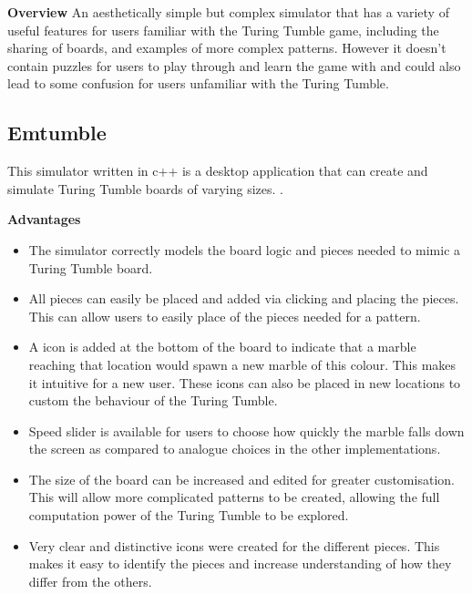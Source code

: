 \documentclass{l4proj}
\begin{document}
\textbf{Overview}
An aesthetically simple but complex simulator that has a variety of useful features for users familiar with the Turing Tumble game, including the sharing of boards, and examples of more complex patterns. However it doesn't contain puzzles for users to play through and learn the game with and could also lead to some confusion for users unfamiliar with the Turing Tumble.

\subsection{Emtumble}
This simulator written in c++ is a desktop application that can create and simulate Turing Tumble boards of varying sizes. \cite{tomita_oudonemtumble_2020}.

\textbf{Advantages}
\begin{itemize}
    \item The simulator correctly models the board logic and pieces needed to mimic a Turing Tumble board.
    \item All pieces can easily be placed and added via clicking and placing the pieces. This can allow users to easily place of the pieces needed for a pattern.
    \item A icon is added at the bottom of the board to indicate that a marble reaching that location would spawn a new marble of this colour. This makes it intuitive for a new user. These icons can also be placed in new locations to custom the behaviour of the Turing Tumble.
    \item Speed slider is available for users to choose how quickly the marble falls down the screen as compared to analogue choices in the other implementations.
    \item The size of the board can be increased and edited for greater customisation. This will allow more complicated patterns to be created, allowing the full computation power of the Turing Tumble to be explored.
    \item Very clear and distinctive icons were created for the different pieces. This makes it easy to identify the pieces and increase understanding of how they differ from the others.
\end{itemize}
\end{document}
